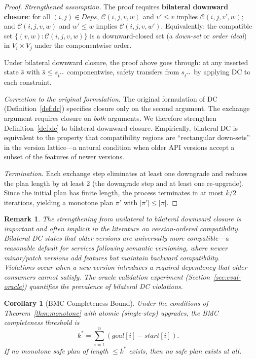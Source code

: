 \documentclass[10pt,twocolumn]{article}
\newtheorem{corollary}[theorem]{Corollary}
\newtheorem{remark}[theorem]{Remark}
\begin{document}
\begin{proof}
\emph{Strengthened assumption.} The proof requires \textbf{bilateral downward closure}: for all $(i,j) \in \mathit{Deps}$, $\mathcal{C}(i,j,v,w)$ and $v' \leq v$ implies $\mathcal{C}(i,j,v',w)$; and $\mathcal{C}(i,j,v,w)$ and $w' \leq w$ implies $\mathcal{C}(i,j,v,w')$. Equivalently: the compatible set $\{(v,w) : \mathcal{C}(i,j,v,w)\}$ is a downward-closed set (a \emph{down-set} or \emph{order ideal}) in $V_i \times V_j$ under the componentwise order.

Under bilateral downward closure, the proof above goes through: at any inserted state $\hat{s}$ with $\hat{s} \leq s_{t^{**}}$ componentwise, safety transfers from $s_{t^{**}}$ by applying DC to each constraint.

\emph{Correction to the original formulation.} The original formulation of DC (Definition~\ref{def:dc}) specifies closure only on the second argument. The exchange argument requires closure on \emph{both} arguments. We therefore strengthen Definition~\ref{def:dc} to bilateral downward closure. Empirically, bilateral DC is equivalent to the property that compatibility regions are ``rectangular down-sets'' in the version lattice---a natural condition when older API versions accept a subset of the features of newer versions.

\emph{Termination.} Each exchange step eliminates at least one downgrade and reduces the plan length by at least 2 (the downgrade step and at least one re-upgrade). Since the initial plan has finite length, the process terminates in at most $k/2$ iterations, yielding a monotone plan $\pi'$ with $|\pi'| \leq |\pi|$.
\end{proof}

\begin{remark}
The strengthening from unilateral to bilateral downward closure is important and often implicit in the literature on version-ordered compatibility. Bilateral DC states that older versions are universally more compatible---a reasonable default for services following semantic versioning, where newer minor/patch versions add features but maintain backward compatibility. Violations occur when a new version introduces a \emph{required} dependency that older consumers cannot satisfy. The oracle validation experiment (Section~\ref{sec:eval-oracle}) quantifies the prevalence of bilateral DC violations.
\end{remark}

\begin{corollary}[BMC Completeness Bound]
\label{cor:completeness}
Under the conditions of Theorem~\ref{thm:monotone} with atomic (single-step) upgrades, the BMC completeness threshold is
\[
  k^* = \sum_{i=1}^{n} (\mathit{goal}[i] - \mathit{start}[i]).
\]
If no monotone safe plan of length $\leq k^*$ exists, then no safe plan exists at all.
\end{corollary}
\end{document}
